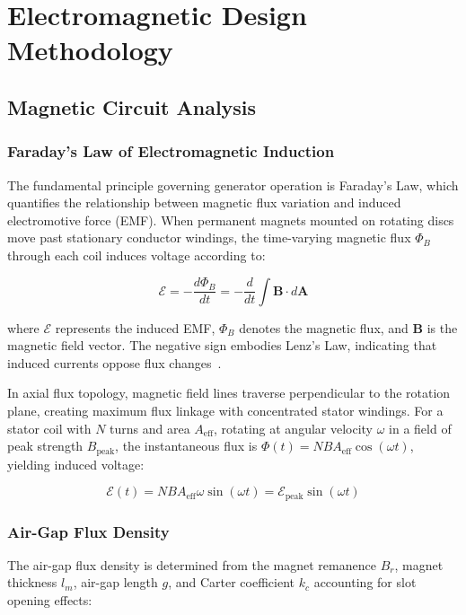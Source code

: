 \documentclass[12pt,a4paper]{article}
\begin{document}
\section{Electromagnetic Design Methodology}
\label{sec:em_design}
\subsection{Magnetic Circuit Analysis}
\subsubsection{Faraday's Law of Electromagnetic Induction}
The fundamental principle governing generator operation is Faraday's Law, which quantifies the relationship between magnetic flux variation and induced electromotive force (EMF). When permanent magnets mounted on rotating discs move past stationary conductor windings, the time-varying magnetic flux $\Phi_B$ through each coil induces voltage according to:

\begin{equation}
\mathcal{E} = -\frac{d\Phi_B}{dt} = -\frac{d}{dt}\int \mathbf{B} \cdot d\mathbf{A}
\end{equation}

where $\mathcal{E}$ represents the induced EMF, $\Phi_B$ denotes the magnetic flux, and $\mathbf{B}$ is the magnetic field vector. The negative sign embodies Lenz's Law, indicating that induced currents oppose flux changes~\cite{ref15,ref16}.

In axial flux topology, magnetic field lines traverse perpendicular to the rotation plane, creating maximum flux linkage with concentrated stator windings. For a stator coil with $N$ turns and area $A_{\text{eff}}$, rotating at angular velocity $\omega$ in a field of peak strength $B_{\text{peak}}$, the instantaneous flux is $\Phi(t) = NBA_{\text{eff}}\cos(\omega t)$, yielding induced voltage:

\begin{equation}
\mathcal{E}(t) = NBA_{\text{eff}}\omega\sin(\omega t) = \mathcal{E}_{\text{peak}}\sin(\omega t)
\end{equation}

\subsubsection{Air-Gap Flux Density}
The air-gap flux density is determined from the magnet remanence $B_r$, magnet thickness $l_m$, air-gap length $g$, and Carter coefficient $k_c$ accounting for slot opening effects:
\end{document}

